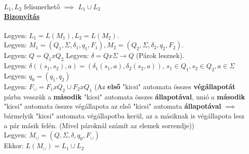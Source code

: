 \documentclass{beamer}
\newcommand{\msmallskip}{\vspace{0.3em}}
\newcommand{\mmedskip}{\vspace{0.5em}}
\newcommand{\mbigskip}{\vspace{1em}}
\begin{document}
\begin{frame}
\begin{tcolorbox}[title={Tétel: Felismerhető nyelvek egyesítése}]
$L_1, L_2$ felismerhető $\implies$ $L_1 \cup L_2$\\
\tcblower
\msmallskip
\underline{\textbf{Bizonyítás}}\\
\mmedskip
\\
Legyen: $L_1 = L(M_1), L_2 = L(M_2)$.\\
Legyen: $M_1 = (Q_1, \Sigma , {\delta}_1, q_1, F_1), M_2 = (Q_2, \Sigma , {\delta}_2, q_2, F_2)$.\\
Legyen: $Q = Q_1 x Q_2$
Legyen: $\delta = Q x \Sigma \rightarrow Q$ (Párok lesznek).\\
Legyen: $\delta((s_1, s_2), a) = ({\delta}_1(s_1, a), {\delta}_2(s_2, a))$, $s_1 \in Q_1, s_2 \in Q_2, a \in \Sigma$\\
\mbigskip
Legyen: $q_0 = (q_1, q_2)$\\
Legyen: \underline{\textbf{$F_{\cup} = F_1 x Q_2 \cup F_2 x Q_1$}} (Az \textbf{első} "kicsi" automata összes \textbf{végállapotát} párba vesszük a \textbf{második} "kicsi" automata összes \textbf{állapotával}, unió a \textbf{második} "kicsi" automata összes végállapota az első "kicsi" automata \textbf{állapotával} $\implies$ bármelyik "kicsi" automata végállapotba kerül, az a másiknak is végállapota lesz a pár másik felén. (Mivel pároknál számít az elemek sorrendje))\\
\msmallskip
Legyen: $M_{\cup} = (Q, \Sigma , \delta , q_0, F_{\cup})$\\
\mbigskip
Ekkor: \underline{$L(M_{\cup}) = L_1 \cup L_2$}\\
\end{tcolorbox}

\end{frame}
\end{document}
